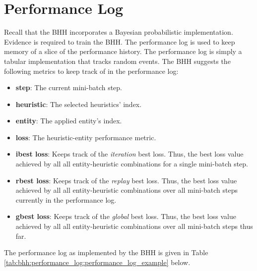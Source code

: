 \section{Performance Log}
\label{sec:bhh:performance_log}

Recall that the \ac{BHH} incorporates a Bayesian probabilistic implementation. Evidence is required to train the \ac{BHH}. The performance log is used to keep memory of a slice of the performance history. The performance log is simply a tabular implementation that tracks random events. The \ac{BHH} suggests the following metrics to keep track of in the performance log:

\begin{itemize}
    \item \textbf{step}: The current mini-batch step. 
    
    \item \textbf{heuristic}: The selected heuristics' index.
    
    \item \textbf{entity}: The applied entity's index.
    
    \item \textbf{loss}: The heuristic-entity performance metric.
    
    \item \textbf{ibest loss}: Keeps track of the \textit{iteration} best loss. Thus, the best loss value achieved by all all entity-heuristic combinations for a single mini-batch step.
    
    \item \textbf{rbest loss}:  Keeps track of the \textit{replay} best loss. Thus, the best loss value achieved by all all entity-heuristic combinations over all mini-batch steps currently in the performance log.
    
    \item \textbf{gbest loss}:  Keeps track of the \textit{global} best loss. Thus, the best loss value achieved by all all entity-heuristic combinations over all mini-batch steps thus far.
\end{itemize}

The performance log as implemented by the \ac{BHH} is given in Table \ref{tab:bhh:performance_log:performance_log_example} below.

